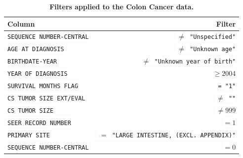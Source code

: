 \documentclass[10pt,letterpaper]{article}
\newcommand{\codewhite}[1]{\colorbox{white}{\texttt{#1}}}
\begin{document}
\begin{table}[!ht]
\begin{adjustwidth}{-2.25in}{0in} %
\caption{\label{tab:colonfilter} {\bf Filters applied to the Colon Cancer data.}}
\begin{tabular}{lr}
\toprule
 Column &  Filter \\
\midrule
\codewhite{SEQUENCE NUMBER-CENTRAL} & \codewhite{$\neq$ "Unspecified"} \\
\codewhite{AGE AT DIAGNOSIS} & \codewhite{$\neq$ "Unknown age"} \\
\codewhite{BIRTHDATE-YEAR} & \codewhite{$\neq$ "Unknown year of birth"} \\
\codewhite{YEAR OF DIAGNOSIS} & \codewhite{$\geq 2004$} \\
\codewhite{SURVIVAL MONTHS FLAG} & \codewhite{= "1"}\\
\codewhite{CS TUMOR SIZE EXT/EVAL} & \codewhite{$\neq$ ""} \\
\codewhite{CS TUMOR SIZE} & \codewhite{$\neq 999$} \\
\codewhite{SEER RECORD NUMBER} & \codewhite{$= 1$} \\
\codewhite{PRIMARY SITE} & \codewhite{ $=$ "LARGE INTESTINE, (EXCL. APPENDIX)"} \\
\codewhite{SEQUENCE NUMBER-CENTRAL} & \codewhite{$=0$} \\
\bottomrule
\end{tabular}
\end{adjustwidth}
\end{table}
\end{document}
